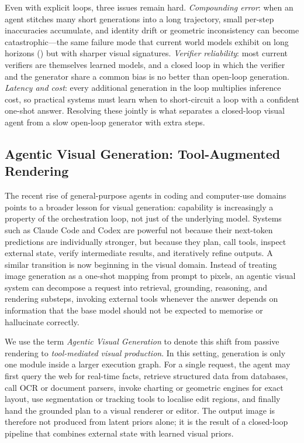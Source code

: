 \documentclass{llmxive}
\begin{document}
Even with explicit loops, three issues remain hard. \emph{Compounding error}: when an agent stitches many short generations into a long trajectory, small per-step inaccuracies accumulate, and identity drift or geometric inconsistency can become catastrophic---the same failure mode that current world models exhibit on long horizons () but with sharper visual signatures. \emph{Verifier reliability}: most current verifiers are themselves learned models, and a closed loop in which the verifier and the generator share a common bias is no better than open-loop generation. \emph{Latency and cost}: every additional generation in the loop multiplies inference cost, so practical systems must learn when to short-circuit a loop with a confident one-shot answer. Resolving these jointly is what separates a closed-loop visual agent from a slow open-loop generator with extra steps.

\subsection{Agentic Visual Generation: Tool-Augmented Rendering}
\label{subsec:agentic_visual_generation}

The recent rise of general-purpose agents in coding and computer-use domains points to a broader lesson for visual generation: capability is increasingly a property of the orchestration loop, not just of the underlying model. Systems such as Claude Code and Codex are powerful not because their next-token predictions are individually stronger, but because they plan, call tools, inspect external state, verify intermediate results, and iteratively refine outputs. A similar transition is now beginning in the visual domain. Instead of treating image generation as a one-shot mapping from prompt to pixels, an agentic visual system can decompose a request into retrieval, grounding, reasoning, and rendering substeps, invoking external tools whenever the answer depends on information that the base model should not be expected to memorise or hallucinate correctly.

We use the term \emph{Agentic Visual Generation} to denote this shift from passive rendering to \emph{tool-mediated visual production}. In this setting, generation is only one module inside a larger execution graph. For a single request, the agent may first query the web for real-time facts, retrieve structured data from databases, call OCR or document parsers, invoke charting or geometric engines for exact layout, use segmentation or tracking tools to localise edit regions, and finally hand the grounded plan to a visual renderer or editor. The output image is therefore not produced from latent priors alone; it is the result of a closed-loop pipeline that combines external state with learned visual priors.
\end{document}
